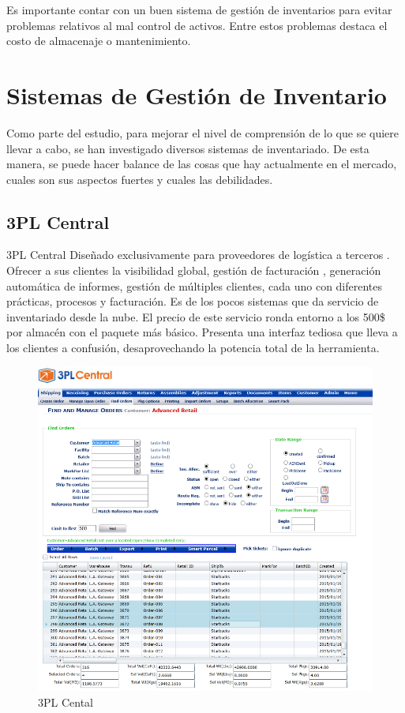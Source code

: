 \documentclass[a4paper,11pt]{book}
\begin{document}
Es importante contar con un buen sistema de gestión de inventarios para evitar problemas relativos al mal control de activos. Entre estos problemas destaca el costo de almacenaje o mantenimiento. 


\section{Sistemas de Gestión de Inventario}

Como parte del estudio, para mejorar el nivel de comprensión de lo que se quiere llevar a cabo, se han investigado diversos sistemas de inventariado. De esta manera, se puede hacer balance de las cosas que hay actualmente en el mercado, cuales son sus aspectos fuertes y cuales las debilidades. 


\subsection{3PL Central}

3PL Central\cite{3pl} Diseñado exclusivamente para proveedores de logística a terceros . Ofrecer a sus clientes la visibilidad global, gestión de facturación , generación automática de informes, gestión de múltiples clientes, cada uno con diferentes prácticas, procesos y facturación. Es de los pocos sistemas que da servicio de inventariado desde la nube. El precio de este servicio ronda entorno a los 500\$ por almacén con el paquete más básico. Presenta una interfaz tediosa que lleva a los clientes a confusión, desaprovechando la potencia total de la herramienta.

\begin{figure}[H]  
\centering 
\includegraphics[scale=0.35]{imagenes/estudioArte/pl-800.png}
\caption{ 3PL Cental  }  
\end{figure} 
\end{document}
